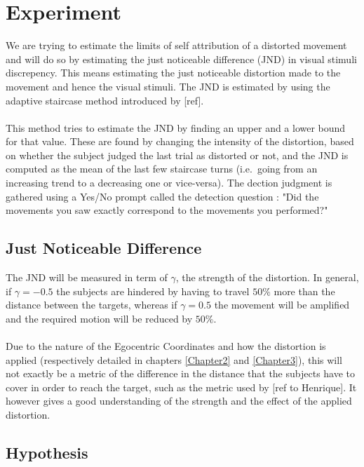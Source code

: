 
\chapter{Experiment} %

\label{Chapter4} %

We are trying to estimate the limits of self attribution of a distorted movement and will do so by estimating the just noticeable difference (JND) in visual stimuli discrepency. This means estimating the just noticeable distortion made to the movement and hence the visual stimuli. The JND is estimated by using the adaptive staircase method introduced by [ref].
\\\\
This method tries to estimate the JND by finding an upper and a lower bound for that value. These are found by changing the intensity of the distortion, based on whether the subject judged the last trial as distorted or not, and the JND is computed as the mean of the last few staircase turns (i.e.\ going from an increasing trend to a decreasing one or vice-versa). The dection judgment is gathered using a Yes/No prompt called the detection question : "Did the movements you saw exactly correspond to the movements you performed?"

\section{Just Noticeable Difference}

The JND will be measured in term of $\gamma$, the strength of the distortion. In general, if $\gamma = -0.5$ the subjects are hindered by having to travel $50\%$ more than the distance between the targets, whereas if $\gamma = 0.5$ the movement will be amplified and the required motion will be reduced by $50\%$.
\\\\
Due to the nature of the Egocentric Coordinates and how the distortion is applied (respectively detailed in chapters \ref{Chapter2} and \ref{Chapter3}), this will not exactly be a metric of the difference in the distance that the subjects have to cover in order to reach the target, such as the metric used by [ref to Henrique]. It however gives a good understanding of the strength and the effect of the applied distortion.

\section{Hypothesis}

